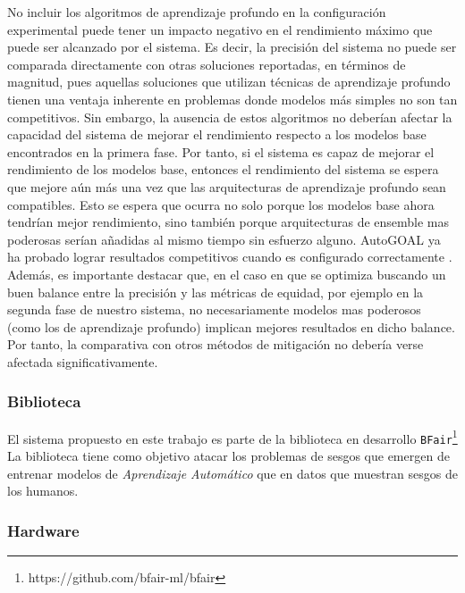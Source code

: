 No incluir los algoritmos de aprendizaje profundo en la configuración experimental puede tener un impacto negativo en el rendimiento máximo que puede ser alcanzado por el sistema.
Es decir, la precisión del sistema no puede ser comparada directamente con otras soluciones reportadas, en términos de magnitud, pues aquellas soluciones que utilizan técnicas de aprendizaje profundo tienen una ventaja inherente en problemas donde modelos más simples no son tan competitivos.
Sin embargo, la ausencia de estos algoritmos no deberían afectar la capacidad del sistema de mejorar el rendimiento respecto a los modelos base encontrados en la primera fase.
Por tanto, si el sistema es capaz de mejorar el rendimiento de los modelos base, entonces el rendimiento del sistema se espera que mejore aún más una vez que las arquitecturas de aprendizaje profundo sean compatibles.
Esto se espera que ocurra no solo porque los modelos base ahora tendrían mejor rendimiento, sino también porque arquitecturas de ensemble mas poderosas serían añadidas al mismo tiempo sin esfuerzo alguno.
AutoGOAL ya ha probado lograr resultados competitivos cuando es configurado correctamente \parencite{estevez2020automatic}.
Además, es importante destacar que, en el caso en que se optimiza buscando un buen balance entre la precisión y las métricas de equidad, por ejemplo en la segunda fase de nuestro sistema, no necesariamente modelos mas poderosos (como los de aprendizaje profundo) implican mejores resultados en dicho balance.
Por tanto, la comparativa con otros métodos de mitigación no debería verse afectada significativamente.

\subsubsection{Biblioteca}\label{section:library}

El sistema propuesto en este trabajo es parte de la biblioteca en desarrollo \texttt{BFair}\footnote{https://github.com/bfair-ml/bfair}
La biblioteca tiene como objetivo atacar los problemas de sesgos que emergen de entrenar modelos de \emph{Aprendizaje Automático} que en datos que muestran sesgos de los humanos.


\subsubsection{Hardware}\label{section:hardware}

